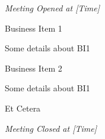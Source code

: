 \documentclass[10pt,a4paper,twoside]{mins}
\begin{document}
\begin{minutes}
\begin{center}\emph{Meeting Opened at [Time]}\end{center}
\begin{business}
\item Business Item 1

Some details about BI1

\item Business Item 2

Some details about BI1

\item Et Cetera

\end{business}
\begin{center}\emph{Meeting Closed at [Time]}\end{center}
\end{minutes}
\end{document}
